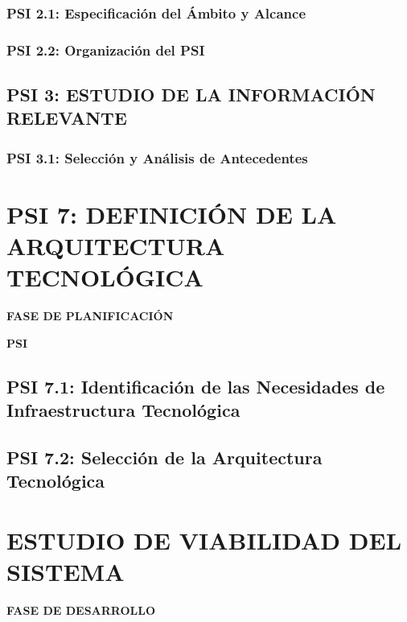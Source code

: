 \documentclass[11pt]{report}
\begin{document}
\subsection{PSI 2.1: Especificación del Ámbito y Alcance} 


\subsection{PSI 2.2: Organización del PSI}



\newpage
\section{PSI 3: ESTUDIO DE LA INFORMACIÓN RELEVANTE}
 
\subsection{PSI 3.1: Selección y Análisis de Antecedentes} 


\chapter{PSI 7: DEFINICIÓN DE LA ARQUITECTURA TECNOLÓGICA}
	\vspace{2cm}	
	\begin{center}
	{\Large \textbf{FASE DE PLANIFICACIÓN} \par}
	\end{center}
	\vspace{5cm}
	
	\begin{center}
	\Huge \textbf{PSI}\par
	\end{center}

\newpage

\section{PSI 7.1: Identificación de las Necesidades de Infraestructura Tecnológica} 

\newpage
\section{PSI 7.2: Selección de la Arquitectura Tecnológica} 

\newpage
\chapter{ESTUDIO DE VIABILIDAD DEL SISTEMA}
	\vspace{2cm}	
	\begin{center}
	{\Large \textbf{FASE DE DESARROLLO} \par}
	\end{center}
	\vspace{5cm}
	
\end{document}
